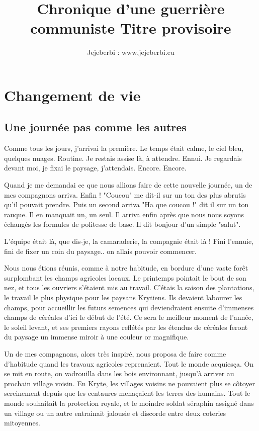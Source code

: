 \documentclass{book}
\author{Jejeberbi : www.jejeberbi.eu}
\title{Chronique d'une guerrière communiste \newline Titre provisoire}
\begin{document}
\maketitle
\tableofcontents

\part{Changement de vie}

\chapter{Une journée pas comme les autres}
Comme tous les jours, j'arrivai la première. Le temps était calme, le ciel bleu, quelques nuages. Routine. Je restais assise là, à attendre. Ennui. Je regardais devant moi, je fixai le paysage, j'attendais. Encore. Encore. \newline

Quand je me demandai ce que nous allions faire de cette nouvelle journée, un de mes compagnons arriva. Enfin ! "Coucou" me dit-il sur un ton des plus abrutis qu'il pouvait prendre. Puis un second arriva "Ha que coucou !" dit il sur un ton rauque. Il en manquait un, un seul. Il arriva enfin après que nous nous soyons échangés les formules de politesse de base. Il dit bonjour d'un simple "salut".\newline

L'équipe était là, que dis-je, la camaraderie, la compagnie était là ! Fini l'ennuie, fini de fixer un coin du paysage.. on allais pouvoir commencer.\newline

Nous nous étions réunis, comme à notre habitude, en bordure d'une vaste forêt surplombant les champs agricoles locaux. Le printemps pointait le bout de son nez, et tous les ouvriers s'étaient mis au travail. C'étais la saison des plantations, le travail le plus physique pour les paysans Krytiens. Ils devaient labourer les champs, pour accueillir les futurs semences qui deviendraient ensuite d'immenses champs de céréales d'ici le début de l'été. Ce sera le meilleur moment de l'année, le soleil levant, et ses premiers rayons reflétés par les étendus de céréales feront du paysage un immense miroir à une couleur or magnifique.\newline

Un de mes compagnons, alors très inspiré, nous proposa de faire comme d'habitude quand les travaux agricoles reprenaient. Tout le monde acquiesça. On se mit en route, on vadrouilla dans les bois environnant, jusqu'à arriver au prochain village voisin. En Kryte, les villages voisins ne pouvaient plus se côtoyer sereinement depuis que les centaures menaçaient les terres des humains. Tout le monde souhaitait la protection royale, et le moindre soldat séraphin assigné dans un village ou un autre entrainait jalousie et discorde entre deux coteries mitoyennes.\newline
\end{document}
